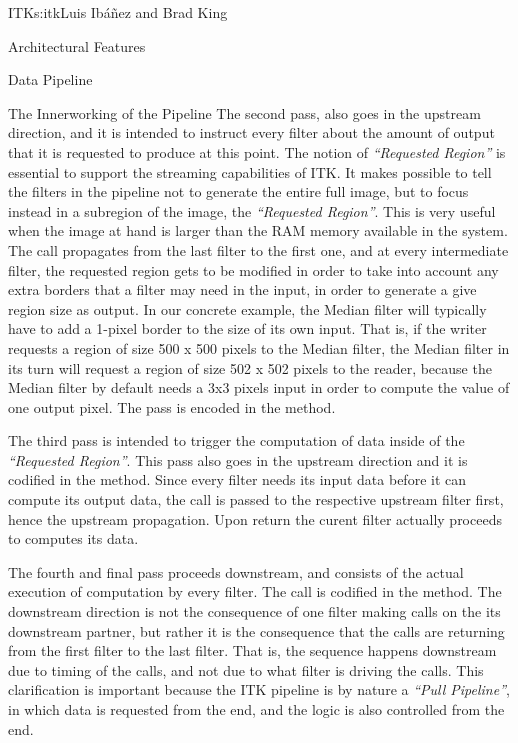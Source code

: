 \begin{aosachapter}{ITK}{s:itk}{Luis Ib\'{a}\~{n}ez and Brad King}
\begin{aosasect1}{Architectural Features}
\begin{aosasect2}{Data Pipeline}
\begin{aosasect3}{The Innerworking of the Pipeline}
The second pass, also goes in the upstream direction, and it is intended to
instruct every filter about the amount of output that it is requested to
produce at this point. The notion of \emph{``Requested Region''} is essential
to support the streaming capabilities of ITK. It makes possible to tell the
filters in the pipeline not to generate the entire full image, but to focus
instead in a subregion of the image, the \emph{``Requested Region''}. This is
very useful when the image at hand is larger than the RAM memory available in
the system. The call propagates from the last filter to the first one, and at
every intermediate filter, the requested region gets to be modified in order to
take into account any extra borders that a filter may need in the input, in
order to generate a give region size as output. In our concrete example, the
Median filter will typically have to add a 1-pixel border to the size of its
own input. That is, if the writer requests a region of size 500 x 500 pixels to
the Median filter, the Median filter in its turn will request a region of size
502 x 502 pixels to the reader, because the Median filter by default needs a
3x3 pixels input in order to compute the value of one output pixel. The pass is
encoded in the  method.

The third pass is intended to trigger the computation of data inside of the
\emph{``Requested Region''}. This pass also goes in the upstream direction and
it is codified in the  method.  Since every filter
needs its input data before it can compute its output data, the call is passed
to the respective upstream filter first, hence the upstream propagation. Upon
return the curent filter actually proceeds to computes its data.

The fourth and final pass proceeds downstream, and consists of the actual
execution of computation by every filter. The call is codified in the
 method. The downstream direction is not the consequence
of one filter making calls on the its downstream partner, but rather it is the
consequence that the  calls are returning from the
first filter to the last filter. That is, the sequence happens downstream due
to timing of the calls, and not due to what filter is driving the calls. This
clarification is important because the ITK pipeline is by nature a \emph{``Pull
Pipeline''}, in which data is requested from the end, and the logic is also
controlled from the end.

\end{aosasect3}


\end{aosasect2}
\end{aosasect1}
\end{aosachapter}
